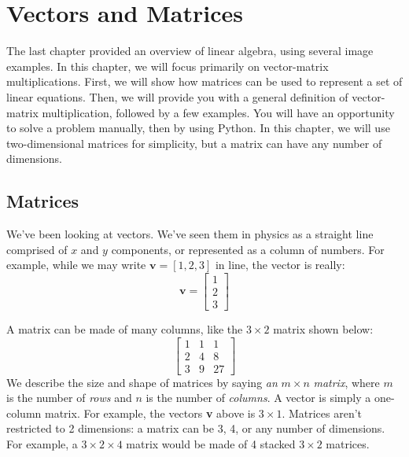 \chapter{Vectors and Matrices}

The last chapter provided an overview of linear algebra, using several image
examples. In this chapter, we will focus primarily on vector-matrix
multiplications. First, we will show how matrices can be used to represent a
set of linear equations. Then, we will provide you with a general definition
of vector-matrix multiplication, followed by a few examples. You will have an
opportunity to solve a problem manually, then by using Python. In this
chapter, we will use two-dimensional matrices for simplicity, but a matrix can
have any number of dimensions.
\section{Matrices}
We've been looking at vectors. We've seen them in physics as a straight line comprised of $x$ and $y$ components, or represented as a column of
numbers. For example, while we may write $\mathbf{v} = \left[ 1, 2, 3 \right]$
in line, the vector is really:
$$\mathbf{v} = \begin{bmatrix}
1\\
2\\
3
\end{bmatrix}$$

A matrix can be made of many columns, like the $3 \times 2$ matrix shown below:
$$\begin{bmatrix}
1 & 1 & 1\\
2 & 4 & 8\\
3 & 9 & 27
\end{bmatrix}$$
We describe the size and shape of matrices by saying \textit{an }$m \times
n$\textit{ matrix}, where $m$ is the number of \emph{rows} and $n$ is the number of
\emph{columns}. A vector is simply a one-column matrix. For example, the vectors
\textbf{v} above is $3 \times 1$. Matrices aren't restricted to 2 dimensions:
a matrix can be 3, 4, or any number of dimensions. For example, a $3 \times 2
\times 4$ matrix would be made of 4 stacked $3 \times 2$ matrices.

